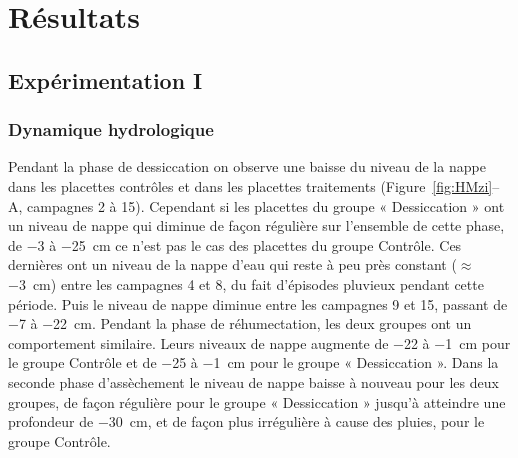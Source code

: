 \section{Résultats}

\subsection{Expérimentation I}

\subsubsection{Dynamique hydrologique}


Pendant la phase de dessiccation on observe une baisse du niveau de la nappe dans les placettes contrôles et dans les placettes traitements (Figure~\ref{fig:HMzi}--A, campagnes 2 à 15).
Cependant si les placettes du groupe « Dessiccation » ont un niveau de nappe qui diminue de façon régulière sur l'ensemble de cette phase, de \num{-3} à \SI{-25}{\centi\metre} ce n'est pas le cas des placettes du groupe Contrôle.
Ces dernières ont un niveau de la nappe d'eau qui reste à peu près constant ($\approx$ \SI{-3}{\centi\metre}) entre les campagnes 4 et 8, du fait d'épisodes pluvieux pendant cette période.
Puis le niveau de nappe diminue entre les campagnes 9 et 15, passant de \num{-7} à \SI{-22}{\centi\metre}.
Pendant la phase de réhumectation, les deux groupes ont un comportement similaire.
Leurs niveaux de nappe augmente de \num{-22} à \SI{-1}{\centi\metre} pour le groupe Contrôle et de \num{-25} à \SI{-1}{\centi\metre} pour le groupe « Dessiccation ».
Dans la seconde phase d'assèchement le niveau de nappe baisse à nouveau pour les deux groupes, de façon régulière pour le groupe « Dessiccation » jusqu'à atteindre une profondeur de \SI{-30}{\centi\metre}, et de façon plus irrégulière à cause des pluies, pour le groupe Contrôle.


